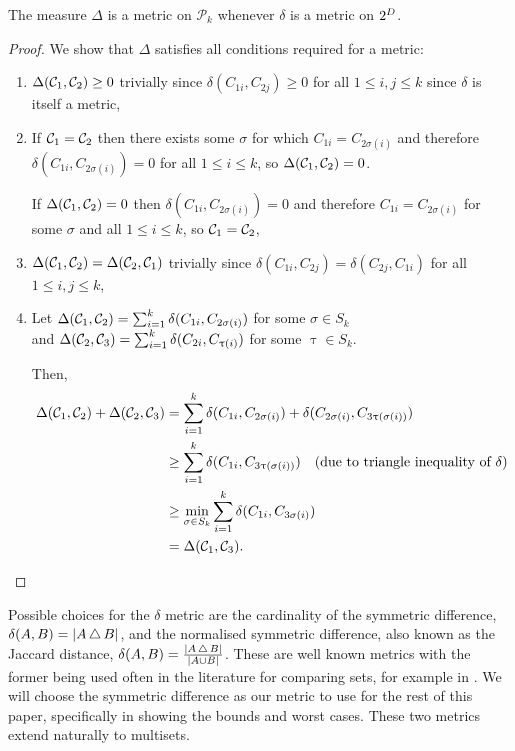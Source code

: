 \begin{thm}
  The measure $\Delta$ is a metric on $\mathcal{P}_k$ whenever $\delta$ is a
  metric on $2^{D}$.
\end{thm}

\begin{proof}
  We show that $\Delta$ satisfies all conditions required for a metric:
  \begin{enumerate}
  \item $\Delta(\mathcal{C}_1, \mathcal{C}_2) \geq 0$ trivially since
    $\delta(C_{1i}, C_{2j}) \geq 0$ for all $1 \leq i,j \leq k$ since
    $\delta$ is itself a metric,
  \item If $\mathcal{C}_1 = \mathcal{C}_2$ then there exists some $\sigma$ for which
    $C_{1i} = C_{2\sigma(i)}$ and therefore $\delta(C_{1i},
    C_{2\sigma(i)}) = 0$ for all $1 \leq i \leq k$, so $\Delta(\mathcal{C}_1,
    \mathcal{C}_2) = 0$.

    If $\Delta(\mathcal{C}_1, \mathcal{C}_2) = 0$ then $\delta(C_{1i},
    C_{2\sigma(i)}) = 0$ and therefore $C_{1i} = C_{2\sigma(i)}$ for
    some $\sigma$ and all $1 \leq i \leq k$, so $\mathcal{C}_1 = \mathcal{C}_2$,
  \item $\Delta(\mathcal{C}_1, \mathcal{C}_2) = \Delta(\mathcal{C}_2, \mathcal{C}_1)$
    trivially since $\delta(C_{1i}, C_{2j}) = \delta(C_{2j}, C_{1i})$
    for all $1 \leq i,j \leq k$,
  \item Let $\Delta(\mathcal{C}_1, \mathcal{C}_2) = \sum_{i=1}^{k} \delta(C_{1i},
    C_{2\sigma(i)})$ for
    some $\sigma \in S_k$\\
    and $\Delta(\mathcal{C}_2, \mathcal{C}_3) = \sum_{i=1}^{k} \delta(C_{2i},
    C_{\uptau(i)})$ for some $\uptau \in S_k$.
    
    Then,
    \vspace{-1em}
    \begin{align*}
      \Delta(\mathcal{C}_1, \mathcal{C}_2) + \Delta(\mathcal{C}_2, \mathcal{C}_3) &=
      \sum_{i=1}^{k} \delta(C_{1i},
      C_{2\sigma(i)}) + \delta(C_{2\sigma(i)}, C_{3\uptau(\sigma(i))})\\
      &\geq \sum_{i=1}^{k} \delta(C_{1i},
      C_{3\uptau(\sigma(i))})\quad\text{(due to
        triangle inequality of $\delta$)}\\
      &\geq \min_{\sigma \in S_k} \sum_{i=1}^{k} \delta(C_{1i}, C_{3\sigma(i)})\\
      &= \Delta(\mathcal{C}_1, \mathcal{C}_3).
    \end{align*}
  \end{enumerate}
\end{proof}

Possible choices for the $\delta$ metric are the cardinality of the symmetric
difference, $\delta(A,B) = |A \operatorname{\bigtriangleup} B|$, and the normalised symmetric
difference, also known as the Jaccard distance, $\delta(A,B) = \frac{|A
  \operatorname{\bigtriangleup} B|}{|A \cup B|}$.  These are well known metrics with the former
being used often in the literature for comparing sets, for example in
\cite{reynolds2006clustering}.  We will choose the symmetric difference as our
metric to use for the rest of this paper, specifically in showing the bounds
and worst cases.  These two metrics extend naturally to multisets.

